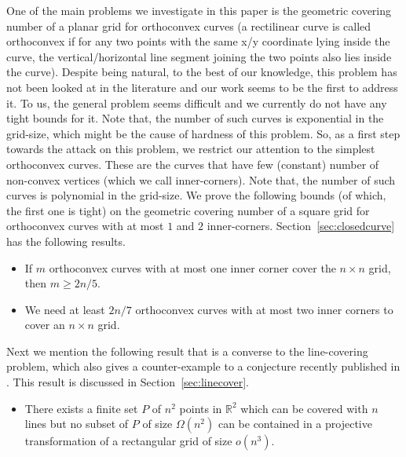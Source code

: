 \documentclass[
final
]{dmtcs-episciences}
\numberwithin{equation}{subsection}
\newcommand{\remove}[1]{}
\begin{document}
One of the main problems we investigate in this paper is the geometric covering number of a planar grid for orthoconvex curves (a rectilinear curve is called orthoconvex if for any two points
with the same x/y coordinate lying inside the curve, the
vertical/horizontal line segment joining the two points also lies
inside the curve). Despite being natural, to the best of our knowledge, this problem has not been looked at in the literature and our work seems to be the first to address it. To us, the general problem seems difficult and we currently do not have any tight bounds for it. Note that, the number of such curves is exponential in the grid-size, which might be the cause of hardness of this problem. So, as a first step towards the attack on this problem, we restrict our attention to the simplest orthoconvex curves. These are the curves that have few (constant) number of non-convex vertices (which we call inner-corners). Note that, the number of such curves is polynomial in the grid-size. We prove the following bounds (of which, the first one is tight) on the geometric covering number of a square grid for orthoconvex curves with at most $1$ and $2$ inner-corners. Section~\ref{sec:closedcurve} has the following results.
\begin{itemize}
	\item If $m$ orthoconvex curves with at most one inner corner cover the $n\times n$ grid, then $m \geq 2n/5$. 
	\item We need at least $2n/7$ orthoconvex curves with at most two inner corners to cover an $n\times n$ grid. 
\end{itemize}
\remove{
	\newtheorem*{thm:orthoconv}{Theorem \ref{thm:orthoconv}}
	\begin{thm:orthoconv}
		If $m$ orthoconvex curves with at most one inner corner cover the $n\times n$ grid, then $m \geq 2n/5$.
	\end{thm:orthoconv}
	
	\newtheorem*{thm:2corner}{Theorem \ref{thm:2corner}}
	\begin{thm:2corner}
		We need at least $2n/7$ orthoconvex curves with at most two inner corners to cover an $n\times n$ grid
	\end{thm:2corner}
}
Next we mention the following result that is a converse to the line-covering problem, which also gives a counter-example to a conjecture recently published in \cite{sheffer_2022}. This result is discussed in Section~\ref{sec:linecover}.
\begin{itemize}
	\item There exists a finite set $P$ of $n^2$ points in $\mathbb{R}^2$ which can be covered with $n$ lines but no subset of $P$ of size $\Omega (n^2)$ can be contained in a projective transformation of a rectangular grid of size $o(n^3)$.
\end{itemize}
\end{document}
